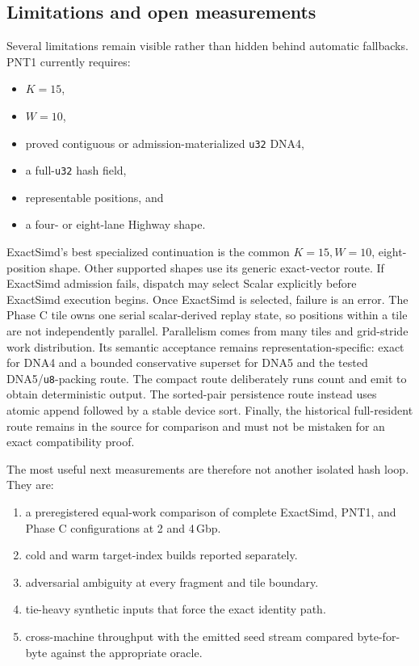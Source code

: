 \subsection{Limitations and open measurements}
\label{sec:minimizer-limitations}

Several limitations remain visible rather than hidden behind automatic
fallbacks. PNT1 currently requires:
\begin{itemize}
  \setlength{\itemsep}{0pt}
  \setlength{\parsep}{0pt}
  \item $K=15$,
  \item $W=10$,
  \item proved contiguous or admission-materialized \texttt{u32} DNA4,
  \item a full-\texttt{u32} hash field,
  \item representable positions, and
  \item a four- or eight-lane Highway shape.
\end{itemize}
ExactSimd's best specialized continuation is the common $K=15,W=10$,
eight-position shape. Other supported shapes use its generic exact-vector
route. If ExactSimd admission fails, dispatch may select Scalar explicitly
before ExactSimd execution begins. Once ExactSimd is selected, failure is an
error. The Phase C tile owns one serial scalar-derived replay state, so
positions within a tile are not independently parallel. Parallelism comes
from many tiles and grid-stride work distribution.
Its semantic acceptance remains representation-specific: exact for DNA4 and a
bounded conservative superset for DNA5 and the tested DNA5/\texttt{u8}-packing route.
The compact route deliberately runs count and emit to obtain deterministic
output. The sorted-pair persistence route instead uses atomic append followed
by a stable device sort. Finally, the historical full-resident route remains
in the source for comparison and must not be mistaken for an exact
compatibility proof.

The most useful next measurements are therefore not another isolated hash
loop. They are:
\begin{enumerate}
  \item a preregistered equal-work comparison of complete ExactSimd, PNT1, and
        Phase C configurations at 2 and 4\,Gbp.
  \item cold and warm target-index builds reported separately.
  \item adversarial ambiguity at every fragment and tile boundary.
  \item tie-heavy synthetic inputs that force the exact identity path.
  \item cross-machine throughput with the emitted seed stream compared
        byte-for-byte against the appropriate oracle.
\end{enumerate}

